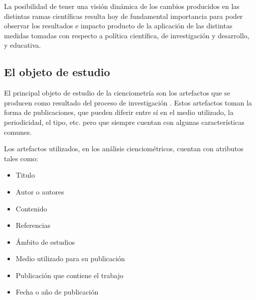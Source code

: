 La posibilidad de tener una visión dinámica de los cambios producidos en las distintas ramas científicas resulta hoy de fundamental importancia para poder observar los resultados e impacto producto de la aplicación de las distintas medidas tomadas con respecto a política científica, de investigación y desarrollo, y educativa.

\subsection{El objeto de estudio}

El principal objeto de estudio de la cienciometría son los artefactos que se producen como resultado del proceso de investigación \cite{chen2002mapping}. Estos artefactos toman la forma de publicaciones, que pueden diferir entre sí en el medio utilizado, la periodicidad, el tipo, etc. pero que siempre cuentan con algunas características comunes.

Los artefactos utilizados, en los análisis cienciométricos, cuentan con atributos tales como:

\begin{itemize}
	\item Titulo
	\item Autor o autores
	\item Contenido
	\item Referencias
	\item Ámbito de estudios
	\item Medio utilizado para su publicación
	\item Publicación que contiene el trabajo
	\item Fecha o año de publicación
\end{itemize}
